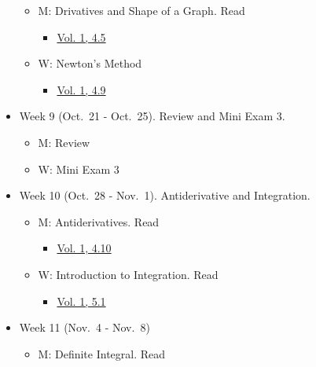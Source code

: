 \documentclass[
]{article}
\providecommand{\tightlist}{%
  \setlength{\itemsep}{0pt}\setlength{\parskip}{0pt}}
\begin{document}
\begin{itemize}
  \begin{itemize}
  \tightlist
  \item
    M: Drivatives and Shape of a Graph. Read

    \begin{itemize}
    \tightlist
    \item
      \href{https://openstax.org/books/calculus-volume-1/pages/4-5-derivatives-and-the-shape-of-a-graph}{Vol. 1, 4.5}
    \end{itemize}
  \item
    W: Newton's Method

    \begin{itemize}
    \tightlist
    \item
      \href{https://openstax.org/books/calculus-volume-1/pages/4-9-newtons-method}{Vol. 1, 4.9}
    \end{itemize}
  \end{itemize}
\item
  Week 9 (Oct.~21 - Oct.~25). Review and Mini Exam 3.

  \begin{itemize}
  \tightlist
  \item
    M: Review
  \item
    W: Mini Exam 3
  \end{itemize}
\item
  Week 10 (Oct.~28 - Nov.~1). Antiderivative and Integration.

  \begin{itemize}
  \tightlist
  \item
    M: Antiderivatives. Read

    \begin{itemize}
    \tightlist
    \item
      \href{https://openstax.org/books/calculus-volume-1/pages/4-10-antiderivatives}{Vol. 1, 4.10}
    \end{itemize}
  \item
    W: Introduction to Integration. Read

    \begin{itemize}
    \tightlist
    \item
      \href{https://openstax.org/books/calculus-volume-1/pages/5-1-approximating-areas}{Vol. 1, 5.1}
    \end{itemize}
  \end{itemize}
\item
  Week 11 (Nov.~4 - Nov.~8)

  \begin{itemize}
  \tightlist
  \item
    M: Definite Integral. Read


\end{itemize}
\end{itemize}
\end{document}
